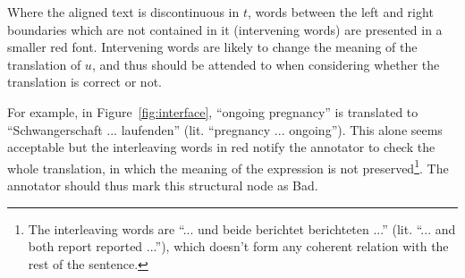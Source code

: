 \documentclass[11pt,letterpaper]{article}
\newcommand{\figref}[1]{Figure~\ref{#1}}
\newcommand{\bh}[1]{\footnote{\color{blue}BH: #1}}
\begin{document}
Where the aligned text is discontinuous in $t$, words between the left
and right boundaries which are not contained in it (intervening words)
are presented in a smaller red font. 
Intervening words are likely to change the meaning of the translation
of $u$, and thus should be attended to when considering whether the translation
is correct or not. 

For example, 
in \figref{fig:interface}, ``ongoing pregnancy'' is translated to
``Schwangerschaft ... laufenden'' (lit. ``pregnancy ... ongoing''). This alone
seems acceptable but the interleaving words in red notify the annotator to check
the whole translation, in which the meaning of the expression is not
preserved\footnote{The interleaving words are ``... und beide berichtet berichteten ...'' (lit.
  ``... and both report reported ...''), which doesn't form any coherent relation with the rest
  of the sentence.}.
The annotator should thus mark this structural node as Bad.



\end{document}
